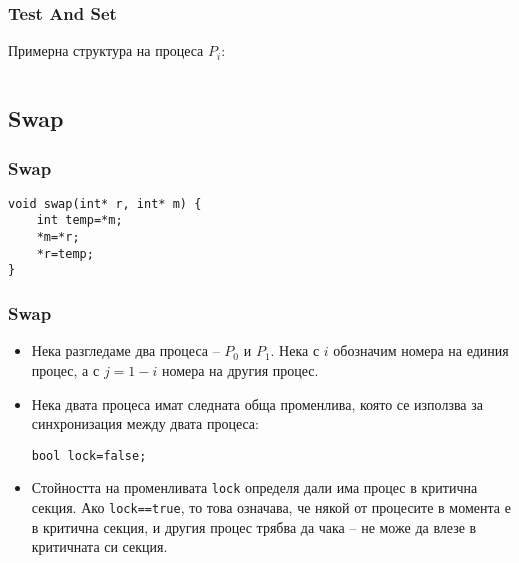 \documentclass[ignorenonframetext, hyperref=unicode]{beamer}
\begin{document}
\begin{frame}[containsverbatim]
\frametitle{Test And Set}
Примерна структура на процеса $P_i$:
\begin{columns}
\end{columns}
\end{frame}


\subsection{Swap}

\begin{frame}[containsverbatim]
\frametitle{Swap}
\begin{lstlisting}
void swap(int* r, int* m) {
	int temp=*m;
	*m=*r;
	*r=temp;
}
\end{lstlisting}
\end{frame}


\begin{frame}[containsverbatim]
\frametitle{Swap}
\begin{itemize}
\item Нека разгледаме два процеса -- $P_0$ и $P_1$. Нека с $i$ обозначим
  номера на единия процес, а с $j=1-i$ номера на другия процес.
\item Нека двата процеса имат следната обща променлива, която се използва за
синхронизация между двата процеса: 
\begin{lstlisting}[numbers=none]
bool lock=false;
\end{lstlisting}
\item Стойността на променливата \lstinline{lock} определя дали има процес в
критична секция. Ако \lstinline{lock==true}, то това означава, че някой от
процесите в момента е в критична секция, и другия процес трябва да чака -- не
може да влезе в критичната си секция.
\end{itemize}
\end{frame}
\end{document}
